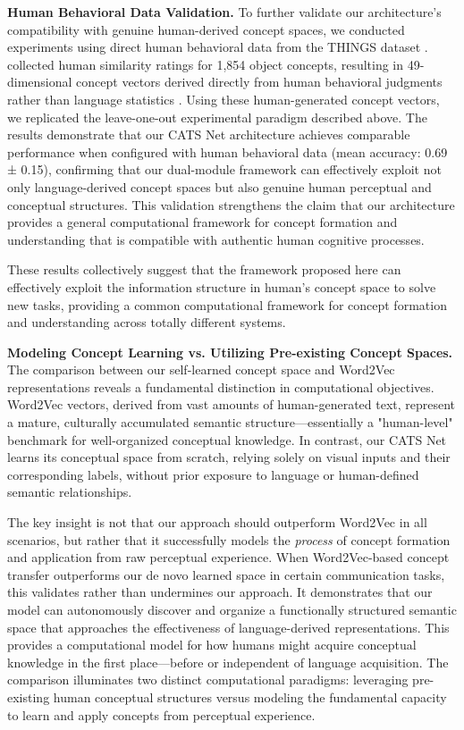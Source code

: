\documentclass[pdflatex,sn-mathphys-num,lineno]{sn-jnl}%
\begin{document}
\begin{CJK}{UTF8}{gbsn}
\textbf{Human Behavioral Data Validation.} To further validate our architecture's compatibility with genuine human-derived concept spaces, we conducted experiments using direct human behavioral data from the THINGS dataset \cite{hebart_things_2019}. collected human similarity ratings for 1,854 object concepts, resulting in 49-dimensional concept vectors derived directly from human behavioral judgments rather than language statistics \cite{hebart_revealing_2020}. Using these human-generated concept vectors, we replicated the leave-one-out experimental paradigm described above. The results demonstrate that our CATS Net architecture achieves comparable performance when configured with human behavioral data (mean accuracy: 0.69 ± 0.15), confirming that our dual-module framework can effectively exploit not only language-derived concept spaces but also genuine human perceptual and conceptual structures. This validation strengthens the claim that our architecture provides a general computational framework for concept formation and understanding that is compatible with authentic human cognitive processes.

These results collectively suggest that the framework proposed here can effectively exploit the information structure in human's concept space to solve new tasks, providing a common computational framework for concept formation and understanding across totally different systems.

\textbf{Modeling Concept Learning vs. Utilizing Pre-existing Concept Spaces.} The comparison between our self-learned concept space and Word2Vec representations reveals a fundamental distinction in computational objectives. Word2Vec vectors, derived from vast amounts of human-generated text, represent a mature, culturally accumulated semantic structure—essentially a "human-level" benchmark for well-organized conceptual knowledge. In contrast, our CATS Net learns its conceptual space from scratch, relying solely on visual inputs and their corresponding labels, without prior exposure to language or human-defined semantic relationships.

The key insight is not that our approach should outperform Word2Vec in all scenarios, but rather that it successfully models the \textit{process} of concept formation and application from raw perceptual experience. When Word2Vec-based concept transfer outperforms our de novo learned space in certain communication tasks, this validates rather than undermines our approach. It demonstrates that our model can autonomously discover and organize a functionally structured semantic space that approaches the effectiveness of language-derived representations. This provides a computational model for how humans might acquire conceptual knowledge in the first place—before or independent of language acquisition. The comparison illuminates two distinct computational paradigms: leveraging pre-existing human conceptual structures versus modeling the fundamental capacity to learn and apply concepts from perceptual experience.


\end{CJK}
\end{document}
